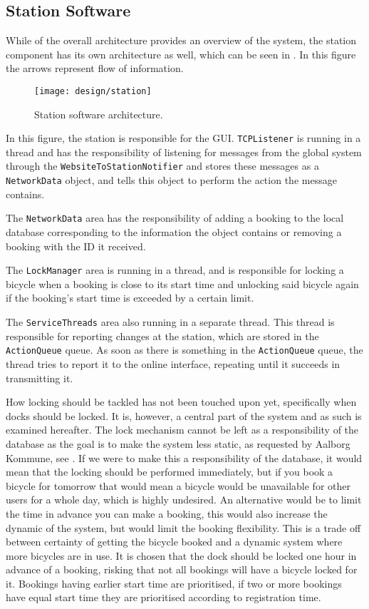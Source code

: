\subsection{Station Software}\label{subsec:stationsoftdesfgi}
While  of the overall architecture provides an overview of the system, the station component has its own architecture as well, which can be seen in . In this figure the arrows represent flow of information.

\begin{figure}[h]
	\centering
	\texttt{[image: design/station]}
	\caption{Station software architecture.}\label{fig:stationarch}
\end{figure}

In this figure, the station is responsible for the GUI.
\texttt{TCPListener} is running in a thread and has the responsibility of listening for messages from the global system through the \texttt{Website\-ToStationNotifier} and stores these messages as a \texttt{NetworkData} object, and tells this object to perform the action the message contains.

The \texttt{NetworkData} area has the responsibility of adding a booking to the local database corresponding to the information the object contains or removing a booking with the ID it received.

The \texttt{LockManager} area is running in a thread, and is responsible for locking a bicycle when a booking is close to its start time and unlocking said bicycle again if the booking's start time is exceeded by a certain limit.

The \texttt{ServiceThreads} area also running in a separate thread.
This thread is responsible for reporting changes at the station, which are stored in the \texttt{ActionQueue} queue.
As soon as there is something in the \texttt{ActionQueue} queue, the thread tries to report it to the online interface, repeating until it succeeds in transmitting it.

How locking should be tackled has not been touched upon yet, specifically when docks should be locked.
It is, however, a central part of the system and as such is examined hereafter.
The lock mechanism cannot be left as a responsibility of the database as the goal is to make the system less static, as requested by Aalborg Kommune, see .
If we were to make this a responsibility of the database, it would mean that the locking should be performed immediately, but if you book a bicycle for tomorrow that would mean a bicycle would be unavailable for other users for a whole day, which is highly undesired.
An alternative would be to limit the time in advance you can make a booking, this would also increase the dynamic of the system, but would limit the booking flexibility.
This is a trade off between certainty of getting the bicycle booked and a dynamic system where more bicycles are in use.
It is chosen that the dock should be locked one hour in advance of a booking, risking that not all bookings will have a bicycle locked for it.
Bookings having earlier start time are prioritised, if two or more bookings have equal start time they are prioritised according to registration time.